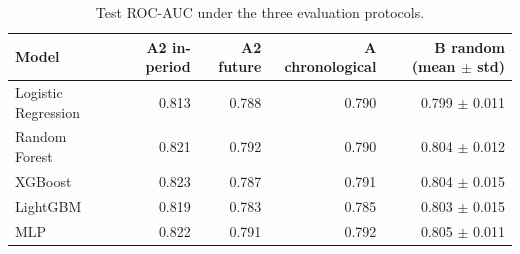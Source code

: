 \begin{table}[t]
\centering
\footnotesize
\caption{Test ROC-AUC under the three evaluation protocols.}
\label{tab:protocols}
\begin{tabular}{lrrrr}
\toprule
Model & A2 in-period & A2 future & A chronological & B random (mean $\pm$ std) \\
\midrule
Logistic Regression & 0.813 & 0.788 & 0.790 & 0.799 $\pm$ 0.011 \\
Random Forest & 0.821 & 0.792 & 0.790 & 0.804 $\pm$ 0.012 \\
XGBoost & 0.823 & 0.787 & 0.791 & 0.804 $\pm$ 0.015 \\
LightGBM & 0.819 & 0.783 & 0.785 & 0.803 $\pm$ 0.015 \\
MLP & 0.822 & 0.791 & 0.792 & 0.805 $\pm$ 0.011 \\
\bottomrule
\end{tabular}
\end{table}
